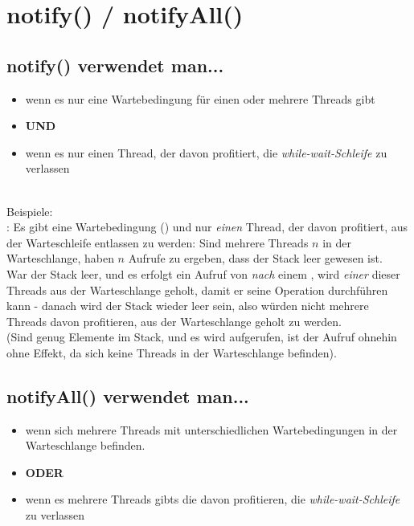 \section{notify() / notifyAll()}

\subsection*{notify() verwendet man...}
\begin{itemize}
    \item wenn es nur eine Wartebedingung für einen oder mehrere Threads gibt
    \item[] \textbf{UND}
    \item wenn es nur einen Thread, der davon profitiert, die \textit{while-wait-Schleife} zu verlassen
\end{itemize}\\

\noindent
Beispiele:\\

\noindent
{}: Es gibt eine Wartebedingung () und nur \textit{einen} Thread, der davon profitiert, aus der Warteschleife entlassen zu werden: Sind mehrere Threads $n$ in der Warteschlange,  haben $n$ Aufrufe zu  ergeben, dass der Stack leer gewesen ist.\\
War der Stack leer, und es erfolgt ein Aufruf von  \textit{nach} einem , wird \textit{einer} dieser Threads aus der Warteschlange geholt, damit er seine Operation durchführen kann - danach wird der Stack wieder leer sein, also würden nicht mehrere Threads davon profitieren, aus der Warteschlange geholt zu werden.\\
(Sind genug Elemente im Stack, und es wird  aufgerufen, ist der Aufruf ohnehin ohne Effekt, da sich keine Threads in der Warteschlange befinden).

\subsection*{notifyAll() verwendet man...}
\begin{itemize}
    \item wenn sich mehrere Threads mit unterschiedlichen Wartebedingungen in der Warteschlange befinden.
    \item[] \textbf{ODER}
    \item wenn es mehrere Threads gibts die davon profitieren, die \textit{while-wait-Schleife} zu verlassen
\end{itemize}\\

